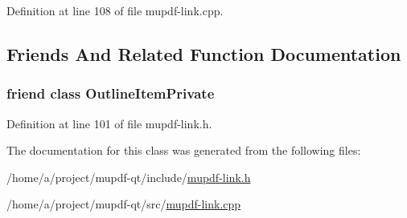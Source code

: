 Definition at line 108 of file mupdf-\/link.\-cpp.



\subsection{Friends And Related Function Documentation}
\hypertarget{class_mu_p_d_f_1_1_link_named_ab008ed670017e41b6e6bba8707c775d2}{
\subsubsection[{Outline\-Item\-Private}]{\setlength{\rightskip}{0pt plus 5cm}friend class Outline\-Item\-Private\hspace{0.3cm}{\ttfamily [friend]}}}\label{class_mu_p_d_f_1_1_link_named_ab008ed670017e41b6e6bba8707c775d2}


Definition at line 101 of file mupdf-\/link.\-h.



The documentation for this class was generated from the following files\-:\begin{DoxyCompactItemize}
\item 
/home/a/project/mupdf-\/qt/include/\hyperlink{mupdf-link_8h}{mupdf-\/link.\-h}\item 
/home/a/project/mupdf-\/qt/src/\hyperlink{mupdf-link_8cpp}{mupdf-\/link.\-cpp}\end{DoxyCompactItemize}

